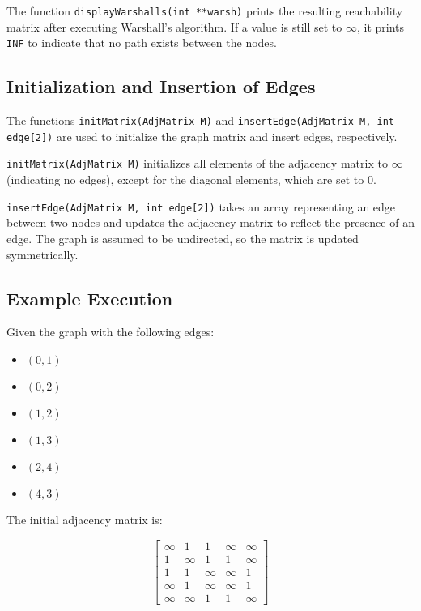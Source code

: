 \documentclass{book}
\begin{document}
The function \texttt{displayWarshalls(int **warsh)} prints the resulting reachability matrix after executing Warshall's algorithm. If a value is still set to \(\infty\), it prints \texttt{INF} to indicate that no path exists between the nodes.

\subsection{Initialization and Insertion of Edges}

The functions \texttt{initMatrix(AdjMatrix M)} and \texttt{insertEdge(AdjMatrix M, int edge[2])} are used to initialize the graph matrix and insert edges, respectively.

\texttt{initMatrix(AdjMatrix M)} initializes all elements of the adjacency matrix to \(\infty\) (indicating no edges), except for the diagonal elements, which are set to 0.

\texttt{insertEdge(AdjMatrix M, int edge[2])} takes an array representing an edge between two nodes and updates the adjacency matrix to reflect the presence of an edge. The graph is assumed to be undirected, so the matrix is updated symmetrically.

\subsection{Example Execution}

Given the graph with the following edges:

\begin{itemize}
    \item \( (0, 1) \)
    \item \( (0, 2) \)
    \item \( (1, 2) \)
    \item \( (1, 3) \)
    \item \( (2, 4) \)
    \item \( (4, 3) \)
\end{itemize}

The initial adjacency matrix is:

\[
\begin{bmatrix}
\infty & 1 & 1 & \infty & \infty \\
1 & \infty & 1 & 1 & \infty \\
1 & 1 & \infty & \infty & 1 \\
\infty & 1 & \infty & \infty & 1 \\
\infty & \infty & 1 & 1 & \infty
\end{bmatrix}
\]
\end{document}
